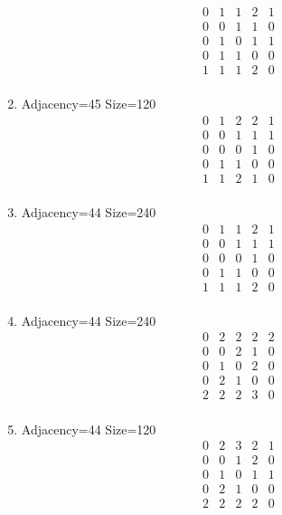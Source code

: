\documentclass[12pt]{article}
\begin{document}
\begin{multicols}{3}
\begin{enumerate}
\begin{equation*}
\begin{array}{ccccc}
0&1&1&2&1\\
0&0&1&1&0\\
0&1&0&1&1\\
0&1&1&0&0\\
1&1&1&2&0\\
\end{array}
\end{equation*}
\item Adjacency=45 Size=120
\begin{equation*}
\begin{array}{ccccc}
0&1&2&2&1\\
0&0&1&1&1\\
0&0&0&1&0\\
0&1&1&0&0\\
1&1&2&1&0\\
\end{array}
\end{equation*}
\item Adjacency=44 Size=240
\begin{equation*}
\begin{array}{ccccc}
0&1&1&2&1\\
0&0&1&1&1\\
0&0&0&1&0\\
0&1&1&0&0\\
1&1&1&2&0\\
\end{array}
\end{equation*}
\item Adjacency=44 Size=240
\begin{equation*}
\begin{array}{ccccc}
0&2&2&2&2\\
0&0&2&1&0\\
0&1&0&2&0\\
0&2&1&0&0\\
2&2&2&3&0\\
\end{array}
\end{equation*}
\item Adjacency=44 Size=120
\begin{equation*}
\begin{array}{ccccc}
0&2&3&2&1\\
0&0&1&2&0\\
0&1&0&1&1\\
0&2&1&0&0\\
2&2&2&2&0\\
\end{array}

\end{equation*}
\end{enumerate}
\end{multicols}
\end{document}
